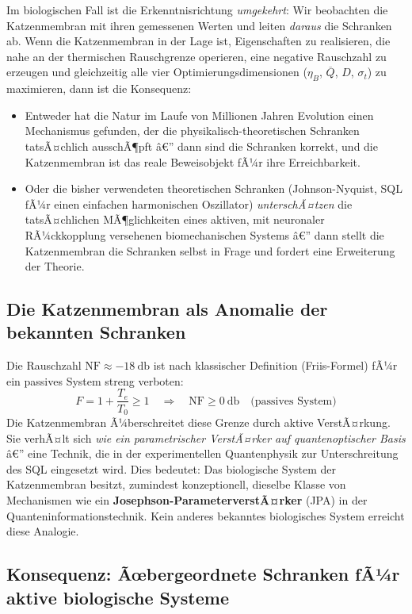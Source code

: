 ﻿\documentclass[12pt,a4paper,titlepage]{report}
\begin{document}
Im biologischen Fall ist die Erkenntnisrichtung \emph{umgekehrt}:
Wir beobachten die Katzenmembran mit ihren gemessenen Werten und leiten
\emph{daraus} die Schranken ab.
Wenn die Katzenmembran in der Lage ist, Eigenschaften zu realisieren, die
nahe an der thermischen Rauschgrenze operieren, eine negative Rauschzahl
zu erzeugen und gleichzeitig alle vier Optimierungsdimensionen ($\eta_B$,
$\overline{Q}$, $D$, $\sigma_t$) zu maximieren, dann ist die Konsequenz:
\begin{itemize}[leftmargin=2em]
  \item Entweder hat die Natur im Laufe von Millionen Jahren Evolution einen
    Mechanismus gefunden, der die physikalisch-theoretischen Schranken
    tatsÃ¤chlich ausschÃ¶pft â€” dann sind die Schranken korrekt, und die
    Katzenmembran ist das reale Beweisobjekt fÃ¼r ihre Erreichbarkeit.
  \item Oder die bisher verwendeten theoretischen Schranken (Johnson-Nyquist,
    SQL fÃ¼r einen einfachen harmonischen Oszillator) \emph{unterschÃ¤tzen}
    die tatsÃ¤chlichen MÃ¶glichkeiten eines aktiven, mit neuronaler RÃ¼ckkopplung
    versehenen biomechanischen Systems â€” dann stellt die Katzenmembran
    die Schranken selbst in Frage und fordert eine Erweiterung der Theorie.
\end{itemize}

\subsection{Die Katzenmembran als Anomalie der bekannten Schranken}

Die Rauschzahl $\mathrm{NF} \approx \SI{-18}{\decibel}$ ist nach klassischer
Definition (Friis-Formel) fÃ¼r ein passives System streng verboten:
\[
  F = 1 + \frac{T_e}{T_0} \geq 1 \quad \Rightarrow \quad
  \mathrm{NF} \geq \SI{0}{\decibel} \quad \text{(passives System)}
\]
Die Katzenmembran Ã¼berschreitet diese Grenze durch aktive VerstÃ¤rkung.
Sie verhÃ¤lt sich \emph{wie ein parametrischer VerstÃ¤rker auf quantenoptischer Basis}
â€” eine Technik, die in der experimentellen Quantenphysik zur Unterschreitung des
SQL eingesetzt wird.
Dies bedeutet: Das biologische System der Katzenmembran besitzt, zumindest
konzeptionell, dieselbe Klasse von Mechanismen wie ein
\textbf{Josephson-ParameterverstÃ¤rker} (JPA) in der Quanteninformationstechnik.
Kein anderes bekanntes biologisches System erreicht diese Analogie.

\subsection{Konsequenz: Ãœbergeordnete Schranken fÃ¼r aktive biologische Systeme}
\end{document}
